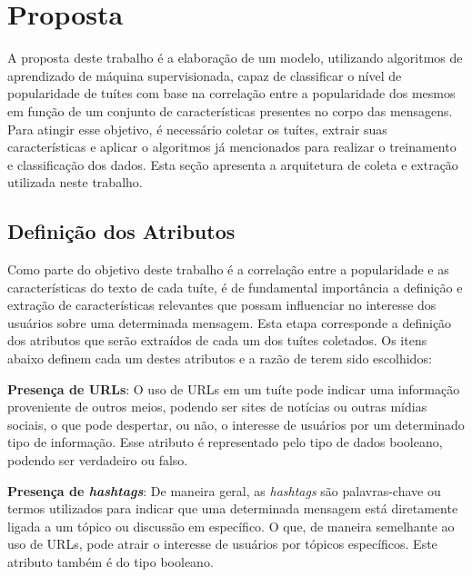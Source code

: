 \documentclass[oneside,openright,12pt]{ufsm_2015} %
\begin{document}

\chapter{Proposta}
\label{sec:proposta}

    \par A proposta deste trabalho é a elaboração de um modelo, utilizando algoritmos de aprendizado de máquina supervisionada, capaz de classificar o nível de popularidade de tuítes com base na correlação entre a popularidade dos mesmos em função de um conjunto de características presentes no corpo das mensagens. Para atingir esse objetivo, é necessário coletar os tuítes, extrair suas características e aplicar o algoritmos já mencionados para realizar o treinamento e classificação dos dados. Esta seção apresenta a arquitetura de coleta e extração utilizada neste trabalho.


\section{Definição dos Atributos}
\label{sec:def-atributos}

    \par Como parte do objetivo deste trabalho é a correlação entre a popularidade e as características do texto de cada tuíte, é de fundamental importância a definição e extração de características relevantes que possam influenciar no interesse dos usuários sobre uma determinada mensagem. Esta etapa corresponde a definição dos atributos que serão extraídos de cada um dos tuítes coletados. Os itens abaixo definem cada um destes atributos e a razão de terem sido escolhidos:

    \par \textbf{Presença de URLs}: O uso de URLs em um tuíte pode indicar uma informação proveniente de outros meios, podendo ser sites de notícias ou outras mídias sociais, o que pode despertar, ou não, o interesse de usuários por um determinado tipo de informação. Esse atributo é representado pelo tipo de dados booleano, podendo ser verdadeiro ou falso.

    \par \textbf{Presença de \textit{hashtags}}: De maneira geral, as \textit{hashtags} são palavras-chave ou termos utilizados para indicar que uma determinada mensagem está diretamente ligada a um tópico ou discussão em específico. O que, de maneira semelhante ao uso de URLs, pode atrair o interesse de usuários por tópicos específicos. Este atributo também é do tipo booleano.
\end{document}

